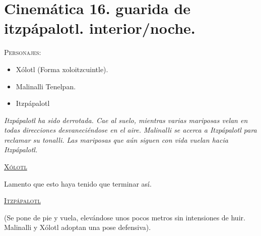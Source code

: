  \section{Cinemática 16. guarida de itzpápalotl. interior/noche.} \label{Cin:Cinematica16}
  \textsc{Personajes}:
  \begin{itemize}
   \item Xólotl (Forma xoloitzcuintle).
	\item Malinalli Tenelpan.
	\item Itzpápalotl
  \end{itemize}
\textit{Itzpápalotl ha sido derrotada. Cae al suelo, mientras varias mariposas velan en todas direcciones desvaneciéndose en el aire. Malinalli se acerca a Itzpápalotl para reclamar su tonalli. Las mariposas que aún siguen con vida vuelan hacia Itzpápalotl.}
\begin{center}
\textsc{\underline{Xólotl}}
\\
\par
Lamento que esto haya tenido que terminar así.
\\
\par
\textsc{\underline{Itzpápalotl}}
\\
\par 
(Se pone de pie y vuela, elevándose unos pocos metros sin intensiones de huir. Malinalli y Xólotl adoptan una pose defensiva).
\end{center}